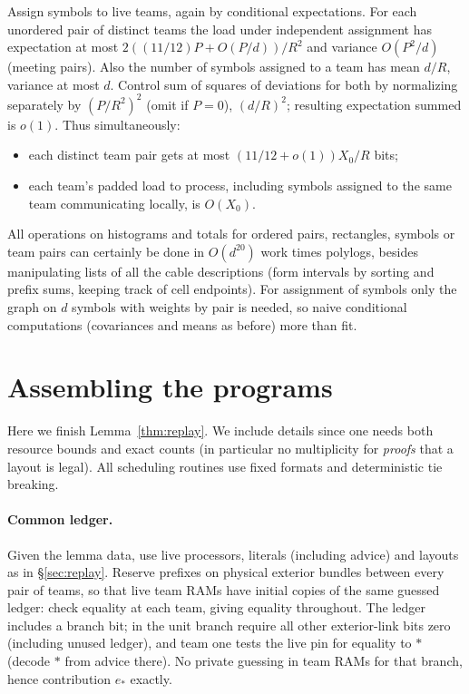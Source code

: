 \documentclass[11pt,letterpaper]{article}
\theoremstyle{definition}
\numberwithin{equation}{section}
\begin{document}
Assign symbols to live teams, again by conditional expectations. For each unordered
pair of distinct teams the load under independent assignment has expectation at most
$2((11/12)P+O(P/d))/R^2$ and variance $O(P^2/d)$ (meeting pairs). Also the number of
symbols assigned to a team has mean $d/R$, variance at most $d$. Control sum of squares of
deviations for both by normalizing separately by $(P/R^2)^2$ (omit if $P=0$), $(d/R)^2$; resulting
expectation summed is $o(1)$. Thus simultaneously:

\begin{itemize}
\item each distinct team pair gets at most $(11/12+o(1))X_0/R$ bits;
\item each team's padded load to process, including symbols assigned to the same team
communicating locally, is $O(X_0)$.
\end{itemize}

All operations on histograms and totals for ordered pairs, rectangles, symbols or team pairs
can certainly be done in $O(d^{20})$ work times polylogs, besides manipulating lists of all the
cable descriptions (form intervals by sorting and prefix sums, keeping track of cell endpoints).
For assignment of symbols only the graph on $d$ symbols with weights by pair is needed, so
naive conditional computations (covariances and means as before) more than fit.

\section{Assembling the programs}\label{sec:assembly}

Here we finish Lemma~\ref{thm:replay}. We include details since one needs both resource bounds and
exact counts (in particular no multiplicity for \emph{proofs} that a layout is legal). All scheduling
routines use fixed formats and deterministic tie breaking.

\paragraph{Common ledger.}
Given the lemma data, use live processors, literals (including advice)
and layouts as in \S\ref{sec:replay}. Reserve prefixes on physical exterior bundles between every pair of
teams, so that live team RAMs have initial copies of the same guessed ledger: check equality
at each team, giving equality throughout. The ledger includes a branch bit; in the unit
branch require all other exterior-link bits zero (including unused ledger), and team one tests
the live pin for equality to $\ast$ (decode $\ast$ from advice there). No private guessing in team
RAMs for that branch, hence contribution $e_\ast$ exactly.
\end{document}
